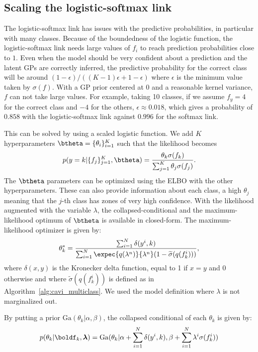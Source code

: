 \subsection{Scaling the logistic-softmax link}
\label{sec:scale_multiclass}
The logistic-softmax link has issues with the predictive probabilities, in particular with many classes.
Because of the boundedness of the logistic function, the logistic-softmax link needs large values of $f_i$ to reach prediction probabilities close to $1$.
Even when the model should be very confident about a prediction and the latent \acp{GP} are correctly inferred, the predictive probability for the correct class will be around $(1-\epsilon) / ((K - 1) \epsilon +  1 - \epsilon)$ where $\epsilon$ is the minimum value taken by $\sigma(f)$.
With a \ac{GP} prior centered at 0 and a reasonable kernel variance, $f$ can not take large values.
For example, taking 10 classes, if we assume $f_y=4$ for the correct class and $-4$ for the others, $\epsilon \approx 0.018$, which gives a probability of $0.858$ with the logistic-softmax link against $0.996$ for the softmax link.

This can be solved by using a scaled logistic function.
We add $K$ hyperparameters $\btheta=\{\theta_{i}\}_{i=1}^K$ such that the likelihood becomes
\begin{align*}
    p(y=k|\{f_j\}_{j=1}^K,\btheta) = \frac{\theta_k \sigma(f_k)}{\sum_{j=1}^K \theta_j \sigma(f_j)}.
\end{align*}
The $\btheta$ parameters can be optimized using the \ac{ELBO} with the other hyperparameters.
These can also provide information about each class, a high $\theta_j$ meaning that the $j$-th class has zones of very high confidence.
With the likelihood augmented with the variable $\lambda$, the collapsed-conditional and the maximum-likelihood optimum of $\btheta$ is available in closed-form.
The maximum-likelihood optimizer is given by:
\begin{align*}
    \theta^*_k = \frac{\sum_{i=1}^N \delta(y^i, k)}{\sum_{i=1}^N \expec{q(\lambda^n)}{\lambda^n}(1 - \widetilde{\sigma}(q(f_k^i)))},
\end{align*}
where $\delta(x,y)$ is the Kronecker delta function, equal to 1 if $x=y$ and 0 otherwise and where $\widetilde{\sigma}(q(f_k^i))$ is defined as in Algorithm~\ref{alg:cavi_multiclass}.
We used the model definition where $\lambda$ is not marginalized out.

By putting a prior $\mathrm{Ga}(\theta_k|\alpha,\beta)$, the collapsed conditional of each $\theta_k$ is given by:
\begin{align*}
    p(\theta_k|\boldf_k, \boldsymbol{\lambda}) = \mathrm{Ga}(\theta_k|\alpha + \sum_{i=1}^N\delta(y^i, k), \beta + \sum_{i=1}^N\lambda^i\sigma(f_k^i))
\end{align*}

